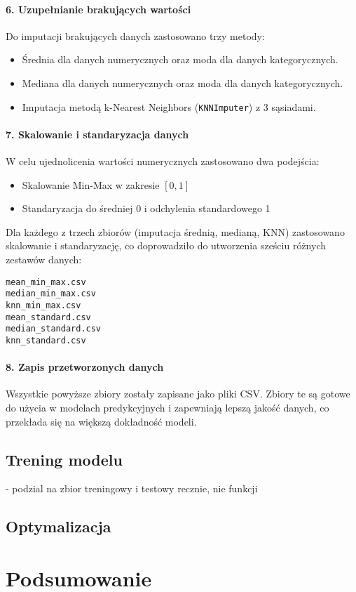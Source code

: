 \documentclass[10pt,letterpaper]{article}
\begin{document}
\paragraph{6. Uzupełnianie brakujących wartości}
Do imputacji brakujących danych zastosowano trzy metody:
\begin{itemize}
    \item Średnia dla danych numerycznych oraz moda dla danych kategorycznych.
    \item Mediana dla danych numerycznych oraz moda dla danych kategorycznych.
    \item Imputacja metodą k-Nearest Neighbors (\texttt{KNNImputer}) z 3 sąsiadami.
\end{itemize}

\paragraph{7. Skalowanie i standaryzacja danych}
W celu ujednolicenia wartości numerycznych zastosowano dwa podejścia:
\begin{itemize}
    \item Skalowanie Min-Max w zakresie $[0, 1]$
    \item Standaryzacja do średniej 0 i odchylenia standardowego 1
\end{itemize}
Dla każdego z trzech zbiorów (imputacja średnią, medianą, KNN) zastosowano skalowanie i standaryzację, co doprowadziło do utworzenia sześciu różnych zestawów danych:
\begin{verbatim}
mean_min_max.csv
median_min_max.csv
knn_min_max.csv
mean_standard.csv
median_standard.csv
knn_standard.csv
\end{verbatim}

\paragraph{8. Zapis przetworzonych danych}
Wszystkie powyższe zbiory zostały zapisane jako pliki CSV. Zbiory te są gotowe do użycia w modelach predykcyjnych i zapewniają lepszą jakość danych, co przekłada się na większą dokładność modeli.



\subsection{Trening modelu}
- podzial na zbior treningowy i testowy recznie, nie funkcji
\subsection{Optymalizacja}

\section{Podsumowanie}


 
\end{document}
